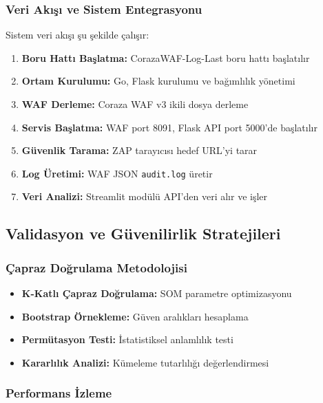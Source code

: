 \newpage

\subsubsection{Veri Akışı ve Sistem Entegrasyonu}

Sistem veri akışı şu şekilde çalışır:

\begin{enumerate}
    \item \textbf{Boru Hattı Başlatma:} CorazaWAF-Log-Last boru hattı başlatılır
    \item \textbf{Ortam Kurulumu:} Go, Flask kurulumu ve bağımlılık yönetimi
    \item \textbf{WAF Derleme:} Coraza WAF v3 ikili dosya derleme
    \item \textbf{Servis Başlatma:} WAF port 8091, Flask API port 5000'de başlatılır
    \item \textbf{Güvenlik Tarama:} ZAP tarayıcısı hedef URL'yi tarar
    \item \textbf{Log Üretimi:} WAF JSON \texttt{audit.log} üretir
    \item \textbf{Veri Analizi:} Streamlit modülü API'den veri alır ve işler
\end{enumerate}

\subsection{Validasyon ve Güvenilirlik Stratejileri}

\subsubsection{Çapraz Doğrulama Metodolojisi}

\begin{itemize}
    \item \textbf{K-Katlı Çapraz Doğrulama:} SOM parametre optimizasyonu
    \item \textbf{Bootstrap Örnekleme:} Güven aralıkları hesaplama  
    \item \textbf{Permütasyon Testi:} İstatistiksel anlamlılık testi
    \item \textbf{Kararlılık Analizi:} Kümeleme tutarlılığı değerlendirmesi
\end{itemize}

\subsubsection{Performans İzleme}

